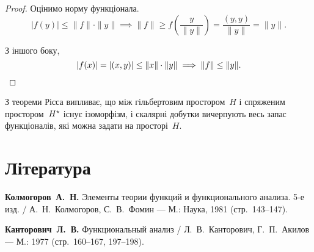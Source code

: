 \begin{proof}
    Оцінимо норму функціонала.
    \begin{equation*}
        |f(y)| \le \|f\| \cdot \|y\| \implies
        \|f\| \ge f \left( \frac{y}{\|y\|} \right) = \frac{(y, y)}{\|y\|} = \|y\|.
    \end{equation*}

    З іншого боку,
    \begin{equation*}
        |f(x)| = |(x, y)| \le \|x\| \cdot \|y\| \implies
        \|f\| \le \|y\|. \qedhere
    \end{equation*}
\end{proof}

\begin{remark}
    З теореми Рісса випливає, що між гільбертовим простором~$H$ і спряженим простором~$H^\star$ існує ізоморфізм, і скалярні добутки вичерпують весь запас функціоналів, які можна задати на просторі~$H$.
\end{remark}

\section{Література}

\begin{enumerate}[label={[\arabic*]}]
\item \textbf{Колмогоров~А.~Н.}
Элементы теории функций и функционального анализа. 5-е изд. /
А.~Н.~Колмогоров, С.~В.~Фомин ---
М.: Наука, 1981 (стр.~143--147).
\item \textbf{Канторович~Л.~В.}
Функциональный анализ /
Л.~В.~Канторович, Г.~П.~Акилов ---
М.: 1977 (стр.~160--167, 197--198).
\end{enumerate}
